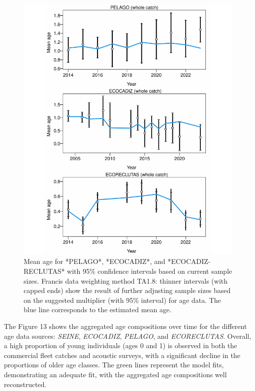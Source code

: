 \documentclass[
]{article}
\begin{document}
\begin{figure}[H]

{\centering \includegraphics[width=0.95\linewidth]{Report_SS3_quarter_with_age_data_S1.0_4FLEETS_files/figure-latex/unnamed-chunk-17-1} 

}

\caption{Mean age for *PELAGO*, *ECOCADIZ*, and *ECOCADIZ-RECLUTAS* with 95\% confidence intervals based on current sample sizes. Francis data weighting method TA1.8: thinner intervals (with capped ends) show the result of further adjusting sample sizes based on the suggested multiplier (with 95\% interval) for age data. The blue line corresponds to the estimated mean age.}\label{fig:unnamed-chunk-17}
\end{figure}

The Figure 13 shows the aggregated age compositions over time for the
different age data sources: \emph{SEINE}, \emph{ECOCADIZ},
\emph{PELAGO}, and \emph{ECORECLUTAS}. Overall, a high proportion of
young individuals (ages 0 and 1) is observed in both the commercial
fleet catches and acoustic surveys, with a significant decline in the
proportions of older age classes. The green lines represent the model
fits, demonstrating an adequate fit, with the aggregated age
compositions well reconstructed.
\end{document}
